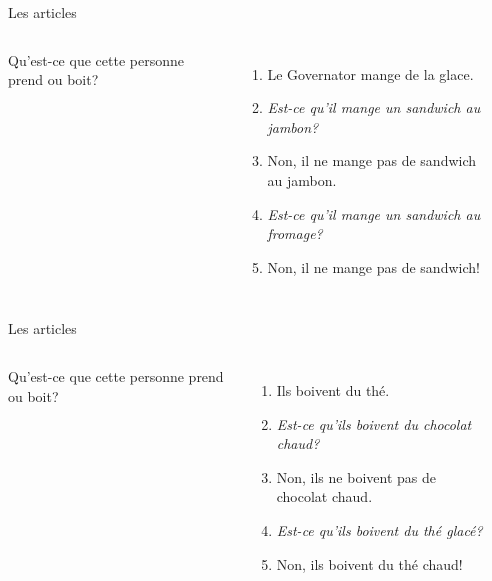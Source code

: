 \documentclass{beamer}
\begin{document}
  \begin{frame}{Les articles}
    \begin{columns}
        Qu'est-ce que cette personne prend ou boit?
        \begin{enumerate}
          \item<2-> Le Governator mange de la glace.
          \item<2-> \emph{Est-ce qu'il mange un sandwich au jambon?}
          \item<3-> Non, il ne mange pas de sandwich au jambon.
          \item<3-> \emph{Est-ce qu'il mange un sandwich au fromage?}
          \item<4-> Non, il ne mange pas de sandwich!
        \end{enumerate}
        \begin{minipage}[c][0.6\textwidth]{\linewidth}
          \begin{center}
          \end{center}
        \end{minipage}
    \end{columns}
  \end{frame}

  \begin{frame}{Les articles}
    \begin{columns}
        Qu'est-ce que cette personne prend ou boit?
        \begin{enumerate}
          \item<2-> Ils boivent du thé.
          \item<2-> \emph{Est-ce qu'ils boivent du chocolat chaud?}
          \item<3-> Non, ils ne boivent pas de chocolat chaud.
          \item<3-> \emph{Est-ce qu'ils boivent du thé glacé?}
          \item<4-> Non, ils boivent du thé chaud!
        \end{enumerate}
        \begin{minipage}[c][0.6\textwidth]{\linewidth}
          \begin{center}
          \end{center}
        \end{minipage}
    \end{columns}
  \end{frame}
\end{document}
